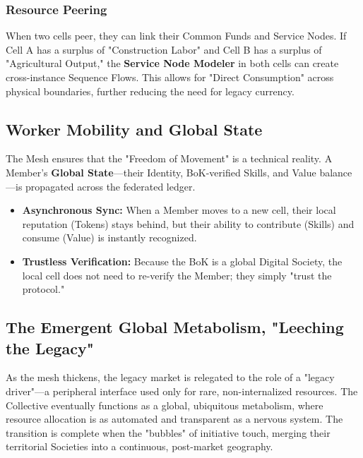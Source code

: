 \subsubsection{Resource Peering}
When two cells peer, they can link their Common Funds and Service Nodes. If Cell A has a surplus of "Construction Labor" and Cell B has a surplus of "Agricultural Output," the \textbf{Service Node Modeler} in both cells can create cross-instance Sequence Flows. This allows for "Direct Consumption" across physical boundaries, further reducing the need for legacy currency.

\subsection{Worker Mobility and Global State}
The Mesh ensures that the "Freedom of Movement" is a technical reality. A Member’s \textbf{Global State}—their Identity, BoK-verified Skills, and Value balance—is propagated across the federated ledger. 
\begin{itemize}[leftmargin=*]
    \item \textbf{Asynchronous Sync:} When a Member moves to a new cell, their local reputation (Tokens) stays behind, but their ability to contribute (Skills) and consume (Value) is instantly recognized.
    \item \textbf{Trustless Verification:} Because the BoK is a global Digital Society, the local cell does not need to re-verify the Member; they simply "trust the protocol."
\end{itemize}

\subsection{The Emergent Global Metabolism, "Leeching the Legacy"}
As the mesh thickens, the legacy market is relegated to the role of a "legacy driver"—a peripheral interface used only for rare, non-internalized resources. The Collective eventually functions as a global, ubiquitous metabolism, where resource allocation is as automated and transparent as a nervous system. The transition is complete when the "bubbles" of initiative touch, merging their territorial Societies into a continuous, post-market geography.

